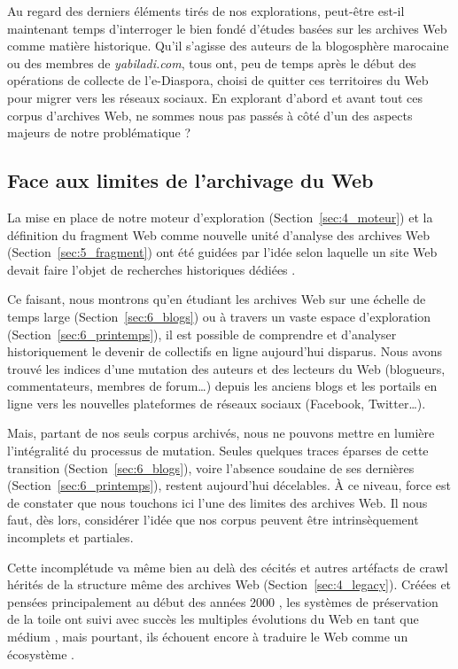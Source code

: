 \documentclass[symmetric,justified,marginals=raggedouter]{tufte-book}
\begin{document}
\noindent Au regard des derniers éléments tirés de nos explorations, peut-être est-il maintenant temps d'interroger le bien fondé d'études basées sur les archives Web comme matière historique. Qu'il s'agisse des auteurs de la blogosphère marocaine ou des membres de \textit{yabiladi.com}, tous ont, peu de temps  après le début des opérations de collecte de l'e-Diaspora, choisi de quitter ces territoires du Web pour migrer vers les réseaux sociaux. En explorant d'abord et avant tout ces corpus d'archives Web, ne sommes nous pas passés à côté d'un des aspects majeurs de notre problématique ?

\subsection{Face aux limites de l'archivage du Web}

\noindent La mise en place de notre moteur d'exploration (Section~\ref{sec:4_moteur}) et la définition du fragment Web comme nouvelle unité d'analyse des archi\-ves Web (Section~\ref{sec:5_fragment}) ont été guidées par l'idée selon laquelle un site Web devait faire l'objet de recherches historiques dédiées \citep{brugger_web_2017}. 

Ce faisant, nous montrons qu'en étudiant les archives Web sur une échelle de temps large (Section~\ref{sec:6_blogs}) ou à travers un vaste espace d'explo\-ration (Section~\ref{sec:6_printemps}), il est possible de comprendre et d'analyser historiquement le devenir de collectifs en ligne aujourd'hui disparus. Nous avons trouvé les indices d'une mutation des auteurs et des lecteurs du Web (blogueurs, commentateurs, membres de forum\ldots{}) depuis les anciens blogs et les portails en ligne vers les nouvelles plateformes de réseaux sociaux (Facebook, Twitter\ldots{}). 

Mais, partant de nos seuls corpus archivés, nous ne pouvons mettre en lumière l'intégralité du processus de mutation. Seules quelques traces éparses de cette transition (Section~\ref{sec:6_blogs}), voire l'absence soudaine de ses dernières (Section~\ref{sec:6_printemps}), restent aujourd'hui décelables. À ce niveau, force est de constater que nous touchons ici l'une des limites des archives Web. Il nous faut, dès lors, considérer l'idée que nos corpus peuvent être intrinsèquement incomplets et partiales. 

Cette incomplétude va même bien au delà des cécités et autres artéfacts de crawl hérités de la structure même des archives Web (Section~\ref{sec:4_legacy}). Créées et pensées principalement au début des années 2000 \citep{masanes_web_2006}, les systèmes de préservation de la toile ont suivi avec succès les multiples évolutions du Web en tant que médium \citep{cho_evolution_1999,oita_archiving_2010,pop_archiving_2010}, mais pourtant, ils échouent encore à traduire le Web comme un écosystème \citep{brugger_website_2009}. 
\end{document}
